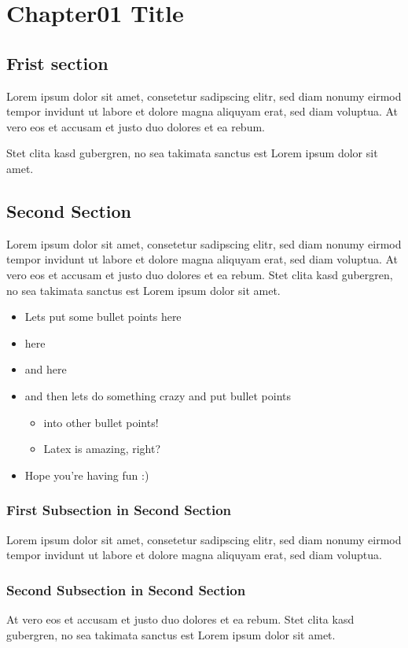 \chapter{Chapter01 Title}

\section{Frist section}
Lorem ipsum dolor sit amet, consetetur sadipscing elitr, sed diam nonumy eirmod tempor invidunt ut labore et dolore magna aliquyam erat, sed diam voluptua. 
At vero eos et accusam et justo duo dolores et ea rebum. 

Stet clita kasd gubergren, no sea takimata sanctus est Lorem ipsum dolor sit amet. 
\section{Second Section}
Lorem ipsum dolor sit amet, consetetur sadipscing elitr, sed diam nonumy eirmod tempor invidunt ut labore et dolore magna aliquyam erat, sed diam voluptua. 
At vero eos et accusam et justo duo dolores et ea rebum. Stet clita kasd gubergren, no sea takimata sanctus est Lorem ipsum dolor sit amet.

\begin{itemize}
    \item Lets put some bullet points here
    \item here
    \item and here
    \item and then lets do something crazy and put bullet points
    \begin{itemize}
        \item into other bullet points! 
        \item Latex is amazing, right? 
    \end{itemize}
    \item Hope you're having fun :) 
\end{itemize}

\subsection{First Subsection in Second Section}
Lorem ipsum dolor sit amet, consetetur sadipscing elitr, sed diam nonumy eirmod tempor invidunt ut labore et dolore magna aliquyam erat, sed diam voluptua. 

\subsection{Second Subsection in Second Section}
At vero eos et accusam et justo duo dolores et ea rebum. 
Stet clita kasd gubergren, no sea takimata sanctus est Lorem ipsum dolor sit amet.   
